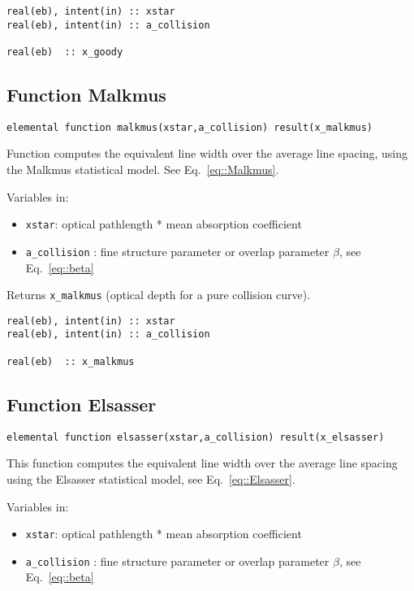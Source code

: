 \begin{lstlisting}
real(eb), intent(in) :: xstar
real(eb), intent(in) :: a_collision

real(eb)  :: x_goody
\end{lstlisting}


\subsection{Function Malkmus}

\begin{lstlisting}
elemental function malkmus(xstar,a_collision) result(x_malkmus)
\end{lstlisting}
Function computes the equivalent line width over the average line spacing, using the Malkmus statistical model. See Eq.~\ref{eq::Malkmus}.

Variables in:
\begin{itemize}
 \item \verb=xstar=: optical pathlength * mean absorption coefficient
  \item \verb=a_collision= : fine structure parameter or overlap parameter $\beta$, see Eq.~\ref{eq::beta}
\end{itemize}

Returns \verb=x_malkmus= (optical depth for a pure collision curve).

\begin{lstlisting}
real(eb), intent(in) :: xstar
real(eb), intent(in) :: a_collision

real(eb)  :: x_malkmus
\end{lstlisting}

\subsection{Function Elsasser}

\begin{lstlisting}
elemental function elsasser(xstar,a_collision) result(x_elsasser)
\end{lstlisting}

This function computes the equivalent line width over the average line spacing using the Elsasser statistical model, see Eq.~\ref{eq::Elsasser}.

Variables in:
\begin{itemize}
 \item \verb=xstar=: optical pathlength * mean absorption coefficient
 \item \verb=a_collision= : fine structure parameter or overlap parameter $\beta$, see Eq.~\ref{eq::beta}
\end{itemize}

